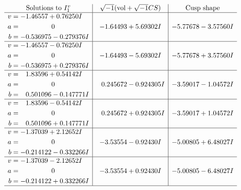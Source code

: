 \documentclass[1p]{elsarticle_modified}
\theoremstyle{definition}
\newcommand{\I}{\sqrt{-1}}
\begin{document}
$$\begin{array}{c|c|c}  
\text{Solutions to }I^v_{1}& \I (\text{vol} + \sqrt{-1}CS) & \text{Cusp shape}\\
 \hline 
\begin{aligned}
v &= -1.46557 + 0.76250 I \\
a &= \phantom{-0.000000 } 0 \\
b &= -0.536975 - 0.279376 I\end{aligned}
 & -1.64493 + 5.69302 I & -5.77678 - 3.57560 I \\ \hline\begin{aligned}
v &= -1.46557 - 0.76250 I \\
a &= \phantom{-0.000000 } 0 \\
b &= -0.536975 + 0.279376 I\end{aligned}
 & -1.64493 - 5.69302 I & -5.77678 + 3.57560 I \\ \hline\begin{aligned}
v &= \phantom{-}1.83596 + 0.54142 I \\
a &= \phantom{-0.000000 } 0 \\
b &= \phantom{-}0.501096 - 0.147771 I\end{aligned}
 & \phantom{-}0.245672 - 0.924305 I & -3.59017 - 1.04572 I \\ \hline\begin{aligned}
v &= \phantom{-}1.83596 - 0.54142 I \\
a &= \phantom{-0.000000 } 0 \\
b &= \phantom{-}0.501096 + 0.147771 I\end{aligned}
 & \phantom{-}0.245672 + 0.924305 I & -3.59017 + 1.04572 I \\ \hline\begin{aligned}
v &= -1.37039 + 2.12652 I \\
a &= \phantom{-0.000000 } 0 \\
b &= -0.214122 - 0.332266 I\end{aligned}
 & -3.53554 - 0.92430 I & -5.00805 + 6.48027 I \\ \hline\begin{aligned}
v &= -1.37039 - 2.12652 I \\
a &= \phantom{-0.000000 } 0 \\
b &= -0.214122 + 0.332266 I\end{aligned}
 & -3.53554 + 0.92430 I & -5.00805 - 6.48027 I\\
 \hline 
 \end{array}$$\newpage
\newpage\renewcommand{\arraystretch}{1}
\end{document}
